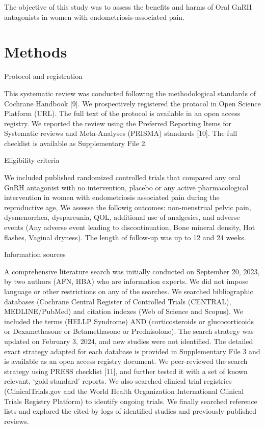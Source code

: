 \documentclass[
  letterpaper,
  DIV=11,
  numbers=noendperiod]{scrartcl}
\begin{document}
The objective of this study was to assess the benefits and harms of Oral
GnRH antagonists in women with endometriosis-associated pain.

\section{Methods}\label{methods}

Protocol and registration

This systematic review was conducted following the methodological
standards of Cochrane Handbook {[}9{]}. We prospectively registered the
protocol in Open Science Platform (URL). The full text of the protocol
is available in an open access registry. We reported the review using
the Preferred Reporting Items for Systematic reviews and Meta-Analyses
(PRISMA) standards {[}10{]}. The full checklist is available as
Supplementary File 2.

Eligibility criteria

We included published randomized controlled trials that compared any
oral GnRH antagonist with no intervention, placebo or any active
pharmacological intervention in women with endometriosis associated pain
during the reproductive age, We assesse the followig outcomes:
non-menstrual pelvic pain, dysmenorrhea, dyspareunia, QOL, additional
use of analgesics, and adverse events (Any adverse event leading to
discontinuation, Bone mineral density, Hot flashes, Vaginal dryness).
The length of follow-up was up to 12 and 24 weeks.

Information sources

A comprehensive literature search was initially conducted on September
20, 2023, by two authors (AFN, HBA) who are information experts. We did
not impose language or other restrictions on any of the searches. We
searched bibliographic databases (Cochrane Central Register of
Controlled Trials (CENTRAL), MEDLINE/PubMed) and citation indexes (Web
of Science and Scopus). We included the terms (HELLP Syndrome) AND
(corticosteroids or glucocorticoids or Dexamethasone or Betamethasone or
Prednisolone). The search strategy was updated on February 3, 2024, and
new studies were not identified. The detailed exact strategy adapted for
each database is provided in Supplementary File 3 and is available as an
open access registry document. We peer-reviewed the search strategy
using PRESS checklist {[}11{]}, and further tested it with a set of
known relevant, `gold standard' reports. We also searched clinical trial
registries (ClinicalTrials.gov and the World Health Organization
International Clinical Trials Registry Platform) to identify ongoing
trials. We finally searched reference lists and explored the cited-by
logs of identified studies and previously published reviews.
\end{document}

